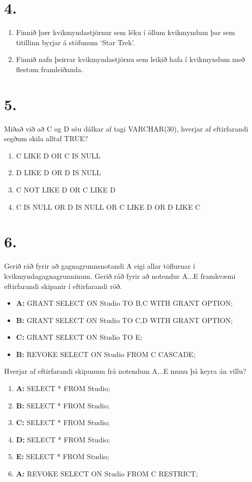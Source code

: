 \documentclass{article}
\newcommand{\bo}[1]{\textbf{#1}}
\newcommand{\enum}{\begin{enumerate}[label = \alph*.]}
\begin{document}
\vspace{1cm}

\section{4.}

\enum 
\item Finnið þær kvikmyndastjörnur sem léku í öllum kvikmyndum
þar sem titillinn byrjar á stöfunum ‘Star Trek’.
\item Finnið nafn þeirrar kvikmyndastjörnu sem leikið hafa í
kvikmyndum með flestum framleiðanda.
\end{enumerate}

\vspace{1cm}

\section{5.}
Miðað við að C og D séu dálkar af tagi VARCHAR(30), hverjar af
eftirfarandi segðum skila alltaf TRUE?

\enum
\item C LIKE D OR C IS NULL
\item D LIKE D OR D IS NULL
\item C NOT LIKE D OR C LIKE D
\item C IS NULL OR D IS NULL OR C LIKE D OR D LIKE C
\end{enumerate}

\newpage

\section{6.}
Gerið ráð fyrir að gagnagrunnsnotandi A eigi allar töflurnar í
kvikmyndagagnagrunninum. Gerið ráð fyrir að notendur A...E
framkvæmi eftirfarandi skipanir í eftirfarandi röð.

\begin{itemize}
\item \bo{A:} GRANT SELECT ON Studio TO B,C WITH GRANT OPTION;
\item \bo{B:} GRANT SELECT ON Studio TO C,D WITH GRANT OPTION;
\item \bo{C:} GRANT SELECT ON Studio TO E;
\item \bo{B:} REVOKE SELECT ON Studio FROM C CASCADE;
\end{itemize}
Hverjar af eftirfarandi skipunum frá notendum A...E munu þá keyra
án villu?
\enum
    \item \bo{A:} SELECT * FROM Studio;
    \item \bo{B:} SELECT * FROM Studio;
    \item \bo{C:} SELECT * FROM Studio;
    \item \bo{D:} SELECT * FROM Studio; 
    \item \bo{E:} SELECT * FROM Studio;
    \item \bo{A:} REVOKE SELECT ON Studio FROM C RESTRICT;
\end{enumerate}
\end{document}
